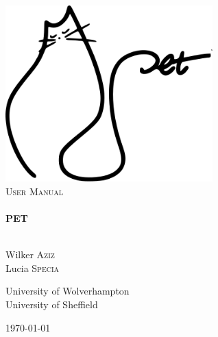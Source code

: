 \begin{titlepage}

\begin{center}



\includegraphics[width=0.60\textwidth]{img/logo-3.png}\\[1cm]    

\textsc{\LARGE \textsc{User Manual}}\\[1.5cm]





\HRule \\[0.4cm]
{ \huge \bfseries \textsc{PET} }\\[0.4cm]
\HRule \\[1.5cm]


\begin{minipage}{0.4\textwidth}
\begin{flushleft} \large
Wilker \textsc{Aziz} \\
Lucia \textsc{Specia} 
\end{flushleft}
\end{minipage}
\begin{minipage}{0.4\textwidth}
\begin{flushright} \large
University of Wolverhampton \\
University of Sheffield
\end{flushright}
\end{minipage}

\vfill

{\large \today}

\end{center}

\end{titlepage}